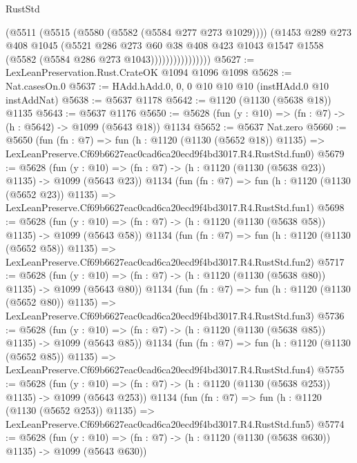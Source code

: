 \begin{lexlean}{RustStd}
\begin{coremodule}
                          (@5511
                            (@5515 (@5580 (@5582 (@5584 @277 @273 @1029))))
                            (@1453
                              @289
                              @273
                              @408
                              @1045
                              (@5521
                                @286
                                @273
                                @60
                                @38
                                @408
                                @423
                                @1043
                                @1547
                                @1558
                                (@5582 (@5584 @286 @273 @1043))))))))))))))))
@5627 := LexLeanPreservation.Rust.CrateOK @1094 @1096 @1098
@5628 := Nat.casesOn.{0}
@5637 := HAdd.hAdd.{0, 0, 0} @10 @10 @10 (instHAdd.{0} @10 instAddNat)
@5638 := @5637 @1178
@5642 := @1120 (@1130 (@5638 @18)) @1135
@5643 := @5637 @1176
@5650 := @5628 (fun (y : @10) => (fn : @7) -> (h : @5642) -> @1099 (@5643 @18)) @1134
@5652 := @5637 Nat.zero
@5660 := @5650
    (fun (fn : @7) =>
    fun (h : @1120 (@1130 (@5652 @18)) @1135) =>
    LexLeanPreserve.Cf69b6627eac0cad6ca20ecd9f4bd3017.R4.RustStd.fun0)
@5679 := @5628
    (fun (y : @10) => (fn : @7) -> (h : @1120 (@1130 (@5638 @23)) @1135) -> @1099 (@5643 @23))
    @1134
    (fun (fn : @7) =>
    fun (h : @1120 (@1130 (@5652 @23)) @1135) =>
    LexLeanPreserve.Cf69b6627eac0cad6ca20ecd9f4bd3017.R4.RustStd.fun1)
@5698 := @5628
    (fun (y : @10) => (fn : @7) -> (h : @1120 (@1130 (@5638 @58)) @1135) -> @1099 (@5643 @58))
    @1134
    (fun (fn : @7) =>
    fun (h : @1120 (@1130 (@5652 @58)) @1135) =>
    LexLeanPreserve.Cf69b6627eac0cad6ca20ecd9f4bd3017.R4.RustStd.fun2)
@5717 := @5628
    (fun (y : @10) => (fn : @7) -> (h : @1120 (@1130 (@5638 @80)) @1135) -> @1099 (@5643 @80))
    @1134
    (fun (fn : @7) =>
    fun (h : @1120 (@1130 (@5652 @80)) @1135) =>
    LexLeanPreserve.Cf69b6627eac0cad6ca20ecd9f4bd3017.R4.RustStd.fun3)
@5736 := @5628
    (fun (y : @10) => (fn : @7) -> (h : @1120 (@1130 (@5638 @85)) @1135) -> @1099 (@5643 @85))
    @1134
    (fun (fn : @7) =>
    fun (h : @1120 (@1130 (@5652 @85)) @1135) =>
    LexLeanPreserve.Cf69b6627eac0cad6ca20ecd9f4bd3017.R4.RustStd.fun4)
@5755 := @5628
    (fun (y : @10) => (fn : @7) -> (h : @1120 (@1130 (@5638 @253)) @1135) -> @1099 (@5643 @253))
    @1134
    (fun (fn : @7) =>
    fun (h : @1120 (@1130 (@5652 @253)) @1135) =>
    LexLeanPreserve.Cf69b6627eac0cad6ca20ecd9f4bd3017.R4.RustStd.fun5)
@5774 := @5628
    (fun (y : @10) => (fn : @7) -> (h : @1120 (@1130 (@5638 @630)) @1135) -> @1099 (@5643 @630))

\end{coremodule}
\end{lexlean}
